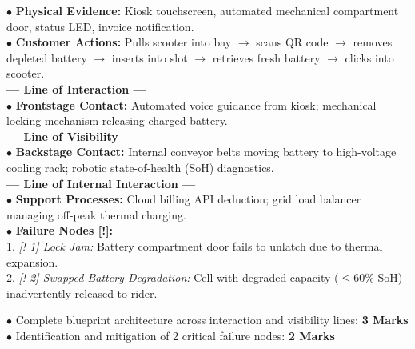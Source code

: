 \begin{solutionbox}
$\bullet$ \textbf{Physical Evidence:} Kiosk touchscreen, automated mechanical compartment door, status LED, invoice notification.\\
$\bullet$ \textbf{Customer Actions:} Pulls scooter into bay $\to$ scans QR code $\to$ removes depleted battery $\to$ inserts into slot $\to$ retrieves fresh battery $\to$ clicks into scooter.\\
\textbf{--- Line of Interaction ---}\\
$\bullet$ \textbf{Frontstage Contact:} Automated voice guidance from kiosk; mechanical locking mechanism releasing charged battery.\\
\textbf{--- Line of Visibility ---}\\
$\bullet$ \textbf{Backstage Contact:} Internal conveyor belts moving battery to high-voltage cooling rack; robotic state-of-health (SoH) diagnostics.\\
\textbf{--- Line of Internal Interaction ---}\\
$\bullet$ \textbf{Support Processes:} Cloud billing API deduction; grid load balancer managing off-peak thermal charging.\\
$\bullet$ \textbf{Failure Nodes [!]:}\\
1. \textit{[! 1] Lock Jam:} Battery compartment door fails to unlatch due to thermal expansion.\\
2. \textit{[! 2] Swapped Battery Degradation:} Cell with degraded capacity ($\le 60\%$ SoH) inadvertently released to rider.
\begin{markingrubric}
$\bullet$ Complete blueprint architecture across interaction and visibility lines: \textbf{3 Marks}\\
$\bullet$ Identification and mitigation of 2 critical failure nodes: \textbf{2 Marks}
\end{markingrubric}
\end{solutionbox}

